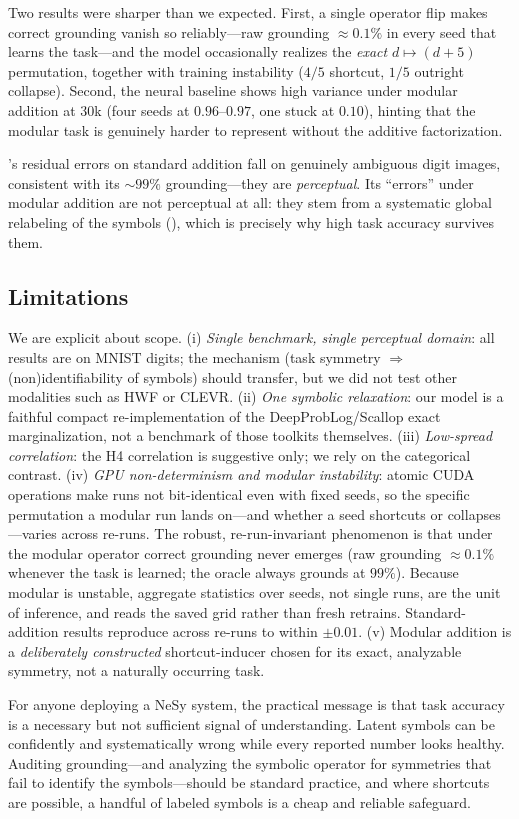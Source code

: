  Two results were sharper than we expected. First, a single operator flip makes
correct grounding vanish so reliably---raw grounding $\approx0.1\%$ in every seed that learns the
task---and the model occasionally realizes the \emph{exact} $d\mapsto(d{+}5)$ permutation, together with
training instability ($4/5$ shortcut, $1/5$ outright collapse). Second, the neural baseline shows high
variance under modular addition at $30$k (four seeds at $0.96$--$0.97$, one stuck at $0.10$), hinting
that the modular task is genuinely harder to represent without the additive factorization.

 \nesy's residual errors on standard addition fall on genuinely ambiguous digit
images, consistent with its ${\sim}99\%$ grounding---they are \emph{perceptual}. Its ``errors'' under
modular addition are not perceptual at all: they stem from a systematic global relabeling of the symbols
(), which is precisely why high task accuracy survives them.

\subsection{Limitations}
\label{sec:limitations}
We are explicit about scope. (i) \emph{Single benchmark, single perceptual domain}: all results are on
MNIST digits; the mechanism (task symmetry $\Rightarrow$ (non)identifiability of symbols) should
transfer, but we did not test other modalities such as HWF or CLEVR. (ii) \emph{One symbolic
relaxation}: our \nesy model is a faithful compact re-implementation of the DeepProbLog/Scallop exact
marginalization, not a benchmark of those toolkits themselves. (iii) \emph{Low-spread correlation}: the
H4 correlation is suggestive only; we rely on the categorical contrast. (iv) \emph{GPU non-determinism
and modular instability}: atomic CUDA operations make runs not bit-identical even with fixed seeds, so
the specific permutation a modular run lands on---and whether a seed shortcuts or collapses---varies
across re-runs. The robust, re-run-invariant phenomenon is that under the modular operator correct
grounding never emerges (raw grounding $\approx0.1\%$ whenever the task is learned; the oracle always
grounds at $99\%$). Because modular \nesy is unstable, aggregate statistics over seeds, not single runs,
are the unit of inference, and  reads the saved grid rather than fresh retrains.
Standard-addition results reproduce across re-runs to within ${\pm}0.01$. (v) Modular addition is a
\emph{deliberately constructed} shortcut-inducer chosen for its exact, analyzable symmetry, not a
naturally occurring task.

 For anyone deploying a NeSy system, the practical message is that task
accuracy is a necessary but not sufficient signal of understanding. Latent symbols can be confidently
and systematically wrong while every reported number looks healthy. Auditing grounding---and analyzing
the symbolic operator for symmetries that fail to identify the symbols---should be standard practice,
and where shortcuts are possible, a handful of labeled symbols is a cheap and reliable safeguard.
